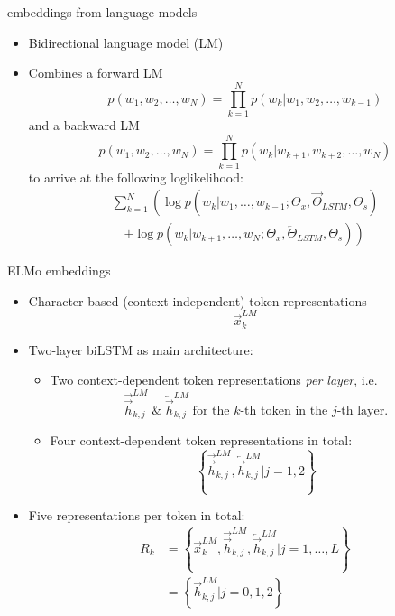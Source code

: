 
\begin{vbframe}{embeddings from language models}

\vfill

\begin{itemize}
		\item Bidirectional language model (LM)
		\item Combines a forward LM $$p\left(w_{1}, w_{2}, \ldots, w_{N}\right)=\prod_{k=1}^{N} p\left(w_{k} | w_{1}, w_{2}, \ldots, w_{k-1}\right)$$
					and a backward LM $$p\left(w_{1}, w_{2}, \ldots, w_{N}\right)=\prod_{k=1}^{N} p\left(w_{k} | w_{k+1}, w_{k+2}, \ldots, w_{N}\right)$$
					to arrive at the following loglikelihood:
					$$\begin{array}{l}
\sum_{k=1}^{N}\left(\log p\left(w_{k} | w_{1}, \ldots, w_{k-1} ; \Theta_{x}, \overrightarrow{\Theta}_{L S T M}, \Theta_{s}\right)\right. \\
\quad\left. +\log p\left(w_{k} | w_{k+1}, \ldots, w_{N} ; \Theta_{x}, \overleftarrow{\Theta}_{L S T M}, \Theta_{s}\right)\right)
\end{array}$$
	\end{itemize}

\vfill

\end{vbframe}


\begin{vbframe}{ELMo embeddings}

\vfill

	\begin{itemize}
		\item Character-based (context-independent) token representations $$\vec x_k^{LM}$$
		\item Two-layer biLSTM as main architecture:
			\begin{itemize}
				\item Two context-dependent token representations \textit{per layer}, i.e.
							$$\overrightarrow{\vec h}_{k, j}^{L M}\; \mbox{\&}\; \overleftarrow{\vec h}_{k, j}^{L M}\; \mbox{for the $k$-th token in the $j$-th layer.}$$
				\item Four context-dependent token representations in total: 
							$$\left\{\overrightarrow{\vec h}_{k, j}^{L M}, \overleftarrow{\vec h}_{k, j}^{L M} | j = 1, 2\right\}$$
			\end{itemize}
		\item Five representations per token in total:
					$$\begin{aligned}
R_{k} &=\left\{\vec x_{k}^{L M}, \overrightarrow{\vec h}_{k, j}^{L M}, \overleftarrow{\vec h}_{k, j}^{L M} | j=1, \ldots, L\right\} \\
&=\left\{\vec h_{k, j}^{L M} | j = 0, 1, 2\right\}
\end{aligned}$$
	\end{itemize}

\vfill

\end{vbframe}

